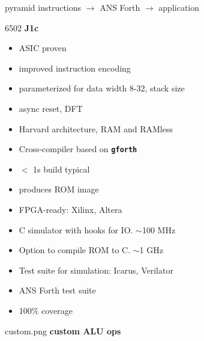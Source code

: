 \documentclass[compress,mathserif]{beamer}
\newcommand{\mach}[1]{\texttt{\textbf{#1}}}
\begin{document}
\begin{imageframe}{pyramid}
  {instructions $\rightarrow$ ANS Forth $\rightarrow$ application}
\end{imageframe}

\begin{imageframe}{6502}
  {\bf\Huge J1c}
\end{imageframe}

\begin{frame}
\begin{itemize}
   \item ASIC proven
   \item improved instruction encoding
   \item parameterized for data width 8-32, stack size
   \item async reset, DFT
   \item Harvard architecture, RAM and RAMless
\end{itemize}
\end{frame}

\begin{frame}
\begin{itemize}
   \item Cross-compiler based on \mach{gforth}
   \item $<$ 1s build typical
   \item produces ROM image
\end{itemize}
\end{frame}

\begin{frame}
\begin{itemize}
   \item FPGA-ready: Xilinx, Altera
   \item C simulator with hooks for IO. $\sim$100 MHz
   \item Option to compile ROM to C. $\sim$1 GHz
\end{itemize}
\end{frame}

\begin{frame}
\begin{itemize}
   \item Test suite for simulation: Icarus, Verilator
   \item ANS Forth test suite
   \item 100\% coverage
\end{itemize}
\end{frame}

\begin{imageframe}{custom.png}
  {\bf\LARGE custom ALU ops}
\end{imageframe}
\end{document}
